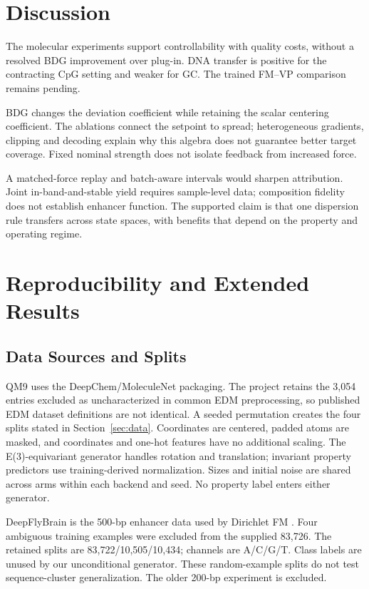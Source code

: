 \documentclass{article}
\begin{document}
\section{Discussion}
The molecular experiments support controllability with quality costs, without a resolved BDG improvement over plug-in. DNA transfer is positive for the contracting CpG setting and weaker for GC. The trained FM--VP comparison remains pending.

BDG changes the deviation coefficient while retaining the scalar centering coefficient. The ablations connect the setpoint to spread; heterogeneous gradients, clipping and decoding explain why this algebra does not guarantee better target coverage. Fixed nominal strength does not isolate feedback from increased force.

A matched-force replay and batch-aware intervals would sharpen attribution. Joint in-band-and-stable yield requires sample-level data; composition fidelity does not establish enhancer function. The supported claim is that one dispersion rule transfers across state spaces, with benefits that depend on the property and operating regime.
\clearpage


\clearpage
\appendix
\renewcommand{\thetable}{S\arabic{table}}
\renewcommand{\theHtable}{S\arabic{table}}
\setcounter{table}{0}
\renewcommand{\thefigure}{S\arabic{figure}}
\renewcommand{\theHfigure}{S\arabic{figure}}
\setcounter{figure}{0}
\section{Reproducibility and Extended Results}
\subsection{Data Sources and Splits}\label{app:data}
QM9 uses the DeepChem/MoleculeNet packaging. The project retains the 3,054 entries excluded as uncharacterized in common EDM preprocessing, so published EDM dataset definitions are not identical. A seeded permutation creates the four splits stated in Section~\ref{sec:data}. Coordinates are centered, padded atoms are masked, and coordinates and one-hot features have no additional scaling. The E(3)-equivariant generator handles rotation and translation; invariant property predictors use training-derived normalization. Sizes and initial noise are shared across arms within each backend and seed. No property label enters either generator.

DeepFlyBrain is the 500-bp enhancer data used by Dirichlet FM \citep{stark2024dirichlet}. Four ambiguous training examples were excluded from the supplied 83,726. The retained splits are 83,722/10,505/10,434; channels are A/C/G/T. Class labels are unused by our unconditional generator. These random-example splits do not test sequence-cluster generalization. The older 200-bp experiment is excluded.
\end{document}
